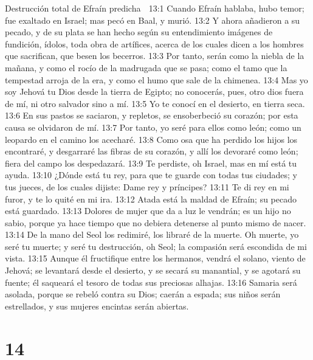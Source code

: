 Destrucción total de Efraín predicha  

13:1 Cuando Efraín hablaba, hubo temor; fue exaltado en Israel; mas pecó en Baal, y murió.  
13:2 Y ahora añadieron a su pecado, y de su plata se han hecho según su entendimiento imágenes de fundición, ídolos, toda obra de artífices, acerca de los cuales dicen a los hombres que sacrifican, que besen los becerros.  
13:3 Por tanto, serán como la niebla de la mañana, y como el rocío de la madrugada que se pasa; como el tamo que la tempestad arroja de la era, y como el humo que sale de la chimenea.  
13:4 Mas yo soy Jehová tu Dios desde la tierra de Egipto; no conocerás, pues, otro dios fuera de mí, ni otro salvador sino a mí.  
13:5 Yo te conocí en el desierto, en tierra seca.  
13:6 En sus pastos se saciaron, y repletos, se ensoberbeció su corazón; por esta causa se olvidaron de mí.  
13:7 Por tanto, yo seré para ellos como león; como un leopardo en el camino los acecharé.  
13:8 Como osa que ha perdido los hijos los encontraré, y desgarraré las fibras de su corazón, y allí los devoraré como león; fiera del campo los despedazará.  
13:9 Te perdiste, oh Israel, mas en mí está tu ayuda.  
13:10 ¿Dónde está tu rey, para que te guarde con todas tus ciudades; y tus jueces, de los cuales dijiste: Dame rey y príncipes?  
13:11 Te di rey en mi furor, y te lo quité en mi ira. 
13:12 Atada está la maldad de Efraín; su pecado está guardado.  
13:13 Dolores de mujer que da a luz le vendrán; es un hijo no sabio, porque ya hace tiempo que no debiera detenerse al punto mismo de nacer.  
13:14 De la mano del Seol los redimiré, los libraré de la muerte. Oh muerte, yo seré tu muerte; y seré tu destrucción, oh Seol; la compasión será escondida de mi vista.  
13:15 Aunque él fructifique entre los hermanos, vendrá el solano, viento de Jehová; se levantará desde el desierto, y se secará su manantial, y se agotará su fuente; él saqueará el tesoro de todas sus preciosas alhajas.  
13:16 Samaria será asolada, porque se rebeló contra su Dios; caerán a espada; sus niños serán estrellados, y sus mujeres encintas serán abiertas.  

\chapter{14}

